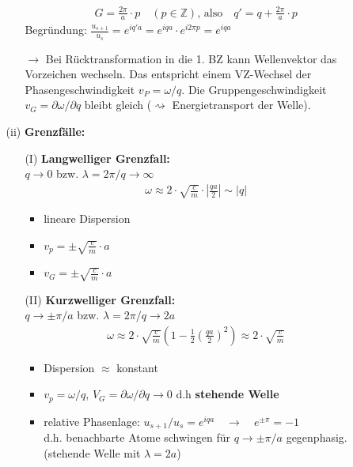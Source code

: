 \begin{itemize}
\begin{itemize}
\begin{itemize}
\begin{align*}
					G = \frac{2 \pi}{a} \cdot p \quad (p \in \mathbb{Z})\text{, also} \quad q' = q + \frac{2 \pi}{a} \cdot p
				\end{align*}
				Begründung: $\frac{u_{s+1}}{u_{s}} = e^{iq'a} = e^{iqa}\cdot e^{i2\pi p} = e^{iqa}$
				\item[$\rightarrow$] Bei Rücktransformation in die 1. BZ kann Wellenvektor das Vorzeichen wechseln. Das entspricht einem VZ-Wechsel der Phasengeschwindigkeit $v_P = \omega / q$. Die Gruppengeschwindigkeit $v_G = \partial\omega / \partial q$ bleibt gleich ($\rightsquigarrow$ Energietransport der Welle).
			\end{itemize}
		\item[(ii)] \textbf{Grenzfälle:} \\
			\begin{itemize}
				\item[(I)] \textbf{Langwelliger Grenzfall:}\\
				$q \rightarrow 0$ bzw. $\lambda = 2 \pi / q \rightarrow \infty$
				\begin{align*}
					\omega \approx 2 \cdot \sqrt{\frac{c}{m}} \cdot \left| \frac{qa}{2} \right| \sim \left| q \right| 
				\end{align*}
				\begin{itemize}
					\item lineare Dispersion
					\item $v_p = \pm \sqrt{\frac{c}{m}}\cdot a $
					\item $v_G = \pm \sqrt{\frac{c}{m}} \cdot a $
				\end{itemize}
				\item[(II)] \textbf{Kurzwelliger Grenzfall:}\\
				$q \rightarrow \pm \pi / a$ bzw. $\lambda = 2 \pi / q \rightarrow 2a$
				\begin{align*}
					\omega \approx 2 \cdot \sqrt{\frac{c}{m}} \left(1-\frac{1}{2} \left( \frac{qa}{2} \right)^2\right) \approx 2 \cdot \sqrt{\frac{c}{m}}
				\end{align*}
				\begin{itemize}
					\item Dispersion $\approx$ konstant
					\item $v_p = \omega / q $, $V_G = \partial \omega / \partial q \to 0$ d.h \textbf{stehende Welle}
					\item relative Phasenlage: $u_{s+1} / u_s = e^{iqa} \quad \rightarrow \quad e^{\pm \pi} = -1$\\
					d.h. benachbarte Atome schwingen für $q \rightarrow \pm \pi / a$ gegenphasig. (stehende Welle mit $\lambda = 2a$)\\

\end{itemize}
\end{itemize}
\end{itemize}
\end{itemize}
